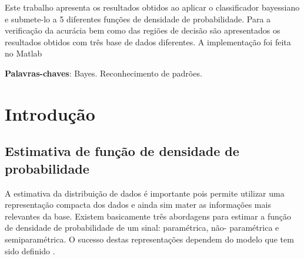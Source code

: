 \documentclass[ 
	article,			%
	11pt,				%
	oneside,			%
	a4paper,			%
	english,			%
	brazil,				%
	]{abntex2}
\begin{document}
\frenchspacing 


%
%
\maketitle

\begin{resumoumacoluna}
 Este trabalho apresenta os resultados obtidos ao aplicar o classificador
 bayessiano e submete-lo a 5 diferentes funções de densidade de probabilidade.
 Para a verificação da acurácia bem como das regiões de decisão são
 apresentados os resultados obtidos com três base de dados diferentes.
 A implementação foi feita no Matlab\texttrademark
 
 
 \vspace{\onelineskip}
 
 \noindent
 \textbf{Palavras-chaves}: Bayes. Reconhecimento de padrões.
\end{resumoumacoluna}


\textual

\section*{Introdução}


\subsection{Estimativa de função de densidade de probabilidade}
A estimativa da distribuição de dados é importante pois permite utilizar uma
representação compacta dos dados e ainda sim mater as informações mais
relevantes da base. Existem basicamente três abordagens para estimar a função de
densidade de probabilidade de um sinal: paramétrica, não- paramétrica e
semiparamétrica. O sucesso destas representações dependem do modelo que tem sido
definido \cite{Duda}.
\end{document}
